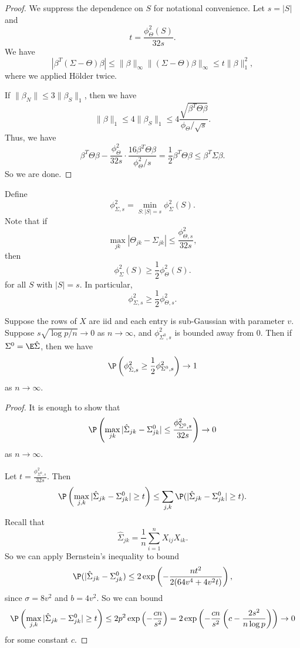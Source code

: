 \documentclass[a4paper]{article}
\begin{document}
\begin{proof}
  We suppress the dependence on $S$ for notational convenience. Let $s = |S|$ and
  \[
    t = \frac{\phi^2_\Theta(S)}{32s}.
  \]
  We have
  \[
    |\beta^T (\Sigma - \Theta) \beta| \leq \|\beta\|_\infty \|(\Sigma - \Theta) \beta\|_\infty \leq t\|\beta\|_1^2,
  \]
  where we applied H\"older twice.

  If $\|\beta_N\| \leq 3 \|\beta_S\|_1$, then we have
  \[
    \|\beta\|_1 \leq 4 \|\beta_S\|_1 \leq 4\frac{\sqrt{\beta^T \Theta \beta}}{\phi_\Theta/\sqrt{s}}.
  \]
  Thus, we have
  \[
    \beta^T \Theta \beta - \frac{\phi^2_\Theta}{32 s} \cdot \frac{16 \beta^T \Theta \beta}{\phi^2_\Theta /s} = \frac{1}{2} \beta^T \Theta \beta \leq \beta^T \Sigma \beta.
  \]
  So we are done.
\end{proof}

Define
\[
  \phi^2_{\Sigma, s} = \min_{S: |S| = s} \phi^2_\Sigma(S).
\]
Note that if
\[
  \max_{jk} |\Theta_{jk} - \Sigma_{jk}| \leq \frac{\phi^2_{\Theta, s}}{32 s},
\]
then
\[
  \phi^2_\Sigma(S) \geq \frac{1}{2} \phi^2_\Theta(S).
\]
for all $S$ with $|S| = s$. In particular,
\[
  \phi^2_{\Sigma, s} \geq \frac{1}{2} \phi^2_{\Theta, s}.
\]
\begin{thm}
  Suppose the rows of $X$ are iid and each entry is sub-Gaussian with parameter $v$. Suppose $s \sqrt{\log p / n} \to 0$ as $n \to \infty$, and $\phi^2_{\Sigma^0, s}$ is bounded away from $0$. Then if $\Sigma^0 = \E \hat{\Sigma}$, then we have
  \[
    \P\left(\phi^2_{\hat{\Sigma}, s} \geq \frac{1}{2} \phi^2_{\Sigma^0, s}\right) \to 1 %
  \]
  as $n \to \infty$.
\end{thm}

\begin{proof}
  It is enough to show that
  \[
    \P\left(\max_{jk} |\hat{\Sigma}_{jk} - \Sigma^0_{jk}| \leq \frac{\phi^2_{\Sigma^0, s}}{32 s}\right) \to 0
  \]
  as $n \to \infty$.

  Let $t = \frac{\phi_{\Sigma^0, s}^2}{32 s}$. Then
  \[
    \P \left(\max_{j,k} |\hat{\Sigma}_{jk} - \Sigma^0_{jk}| \geq t\right) \leq \sum_{j, k} \P(|\hat{\Sigma}_{jk} - \Sigma^0_{jk}| \geq t).
  \]
  Recall that
  \[
    \hat{\Sigma}_{jk} = \frac{1}{n} \sum_{i = 1}^n X_{ij} X_{ik}.
  \]
  So we can apply Bernstein's inequality to bound
  \[
    \P(|\hat{\Sigma}_{jk} - \Sigma^0_{jk}) \leq 2 \exp \left(-\frac{nt^2}{2 (64 v^4 + 4 v^2 t)}\right),
  \]
  since $\sigma = 8v^2$ and $b = 4 v^2$. So we can bound 
  \[
    \P \left(\max_{j,k} |\hat{\Sigma}_{jk} - \Sigma^0_{jk}| \geq t\right) \leq 2 p^2 \exp \left( - \frac{c n}{s^2}\right) = 2 \exp \left(-\frac{c n}{s^2}\left(c - \frac{2s^2}{n \log p}\right)\right) \to 0
  \]
  for some constant $c$. 
\end{proof}
\end{document}
